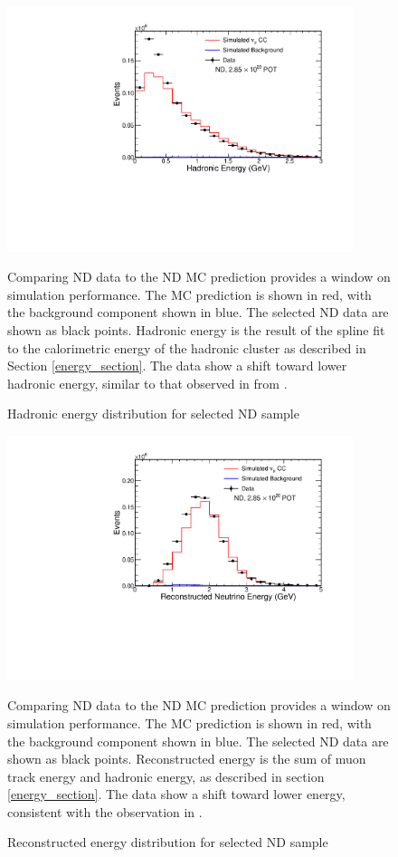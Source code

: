 \begin{figure}
\begin{center}
\includegraphics[width=0.9\textwidth]{figures/selection_nd/hadE_NumuContainND_CVN.pdf}
\end{center}
\caption{Hadronic energy distribution for selected ND sample}{
Comparing ND data to the ND MC prediction provides a window on simulation
performance.  The MC prediction is shown in red, with the background
component shown in blue.
The selected ND data are shown as black points.
Hadronic energy is the result of the spline fit to the calorimetric energy
of the hadronic cluster as described in Section \ref{energy_section}.
The data show a shift toward lower hadronic energy, similar to that observed in
from \cite{nova2016numu}.}
\label{nd_selected_hadE}
\end{figure}


\begin{figure}
\begin{center}
\includegraphics[width=0.9\textwidth]{figures/selection_nd/numuE_NumuContainND_CVN.pdf}
\end{center}
\caption{Reconstructed energy distribution for selected ND sample}{
Comparing ND data to the ND MC prediction provides a window on simulation
performance.  The MC prediction is shown in red, with the background
component shown in blue.
The selected ND data are shown as black points.
Reconstructed energy is the sum of muon track energy and hadronic energy,
as described in section \ref{energy_section}.
The data show a shift toward lower energy, consistent with the
observation in \cite{nova2016numu}.
}
\label{nd_selected_numuE}
\end{figure}


